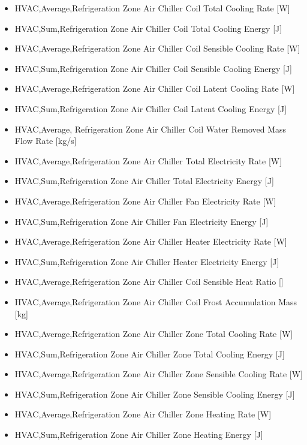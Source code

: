 \begin{itemize}
\item
  HVAC,Average,Refrigeration Zone Air Chiller Coil Total Cooling Rate {[}W{]}
\item
  HVAC,Sum,Refrigeration Zone Air Chiller Coil Total Cooling Energy {[}J{]}
\item
  HVAC,Average,Refrigeration Zone Air Chiller Coil Sensible Cooling Rate {[}W{]}
\item
  HVAC,Sum,Refrigeration Zone Air Chiller Coil Sensible Cooling Energy {[}J{]}
\item
  HVAC,Average,Refrigeration Zone Air Chiller Coil Latent Cooling Rate {[}W{]}
\item
  HVAC,Sum,Refrigeration Zone Air Chiller Coil Latent Cooling Energy {[}J{]}
\item
  HVAC,Average, Refrigeration Zone Air Chiller Coil Water Removed Mass Flow Rate {[}kg/s{]}
\item
  HVAC,Average,Refrigeration Zone Air Chiller Total Electricity Rate {[}W{]}
\item
  HVAC,Sum,Refrigeration Zone Air Chiller Total Electricity Energy {[}J{]}
\item
  HVAC,Average,Refrigeration Zone Air Chiller Fan Electricity Rate {[}W{]}
\item
  HVAC,Sum,Refrigeration Zone Air Chiller Fan Electricity Energy {[}J{]}
\item
  HVAC,Average,Refrigeration Zone Air Chiller Heater Electricity Rate {[}W{]}
\item
  HVAC,Sum,Refrigeration Zone Air Chiller Heater Electricity Energy {[}J{]}
\item
  HVAC,Average,Refrigeration Zone Air Chiller Coil Sensible Heat Ratio {[]}
\item
  HVAC,Average,Refrigeration Zone Air Chiller Coil Frost Accumulation Mass {[}kg{]}
\item
  HVAC,Average,Refrigeration Zone Air Chiller Zone Total Cooling Rate {[}W{]}
\item
  HVAC,Sum,Refrigeration Zone Air Chiller Zone Total Cooling Energy {[}J{]}
\item
  HVAC,Average,Refrigeration Zone Air Chiller Zone Sensible Cooling Rate {[}W{]}
\item
  HVAC,Sum,Refrigeration Zone Air Chiller Zone Sensible Cooling Energy {[}J{]}
\item
  HVAC,Average,Refrigeration Zone Air Chiller Zone Heating Rate {[}W{]}
\item
  HVAC,Sum,Refrigeration Zone Air Chiller Zone Heating Energy {[}J{]}
\end{itemize}

